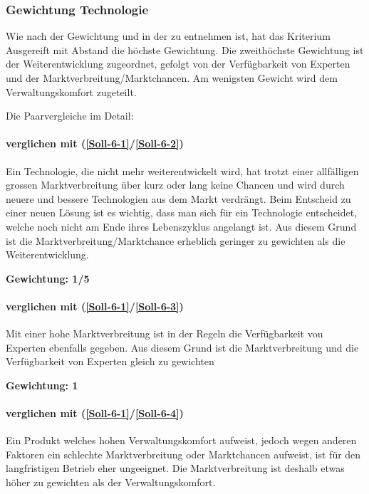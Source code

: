 \subsubsection*{Gewichtung Technologie}

Wie nach der Gewichtung und in der  zu entnehmen ist, hat das Kriterium Ausgereift mit Abstand die höchste Gewichtung. Die zweithöchste Gewichtung ist der Weiterentwicklung zugeordnet, gefolgt von der Verfügbarkeit von Experten und der Marktverbreitung/Marktchancen. Am wenigsten Gewicht wird dem Verwaltungskomfort zugeteilt.

Die Paarvergleiche im Detail:


\paragraph*{ verglichen mit  (\ref{Soll-6-1}/\ref{Soll-6-2})} Ein Technologie, die nicht mehr weiterentwickelt wird, hat trotzt einer allfälligen grossen Marktverbreitung über kurz oder lang keine Chancen und wird durch neuere und bessere Technologien aus dem Markt verdrängt. Beim Entscheid zu einer neuen Lösung ist es wichtig, dass man sich für ein Technologie entscheidet, welche noch nicht am Ende ihres Lebenszyklus angelangt ist. Aus diesem Grund ist die Marktverbreitung/Marktchance erheblich geringer zu gewichten als die Weiterentwicklung.

\textbf{Gewichtung: 1/5}


\paragraph*{ verglichen mit  (\ref{Soll-6-1}/\ref{Soll-6-3})}
Mit einer hohe Marktverbreitung ist in der Regeln die Verfügbarkeit von Experten ebenfalls gegeben. Aus diesem Grund ist die Marktverbreitung und die Verfügbarkeit von Experten gleich zu gewichten

\textbf{Gewichtung: 1}

\paragraph*{ verglichen mit  (\ref{Soll-6-1}/\ref{Soll-6-4})}
Ein Produkt welches hohen Verwaltungskomfort aufweist, jedoch wegen anderen Faktoren ein schlechte Marktverbreitung oder Marktchancen aufweist, ist für den langfristigen Betrieb eher ungeeignet. Die Marktverbreitung ist deshalb etwas höher zu gewichten als der Verwaltungskomfort.

